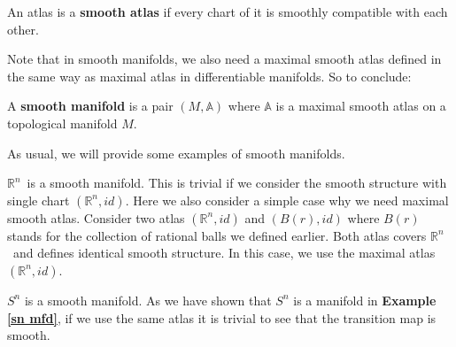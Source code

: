\documentclass[12pt,twoside]{article}
\newcommand{\rn}{$\mathbb{R}^n$}
\begin{document}
\begin{definition}
An atlas is a {\bf smooth atlas} if every chart of it is smoothly compatible with each other.
\end{definition}
Note that in smooth manifolds, we also need a maximal smooth atlas defined in the same way as maximal atlas in differentiable manifolds. So to conclude:
\begin{definition}
A {\bf smooth manifold} is a pair $(M,\mathbb{A})$ where $\mathbb{A}$ is a maximal smooth atlas on a topological manifold $M$.
\end{definition}
As usual, we will provide some examples of smooth manifolds.
\begin{example}

\rn\ is a smooth manifold. This is trivial if we consider the smooth structure with single chart $(\mathbb{R}^{n},id)$. Here we also consider a simple case why we need maximal smooth atlas. Consider two atlas $(\mathbb{R}^{n},id)$ and $(B(r),id)$ where $B(r)$ stands for the collection of rational balls we defined earlier. Both atlas covers \rn\ and defines identical smooth structure. In this case, we use the maximal atlas $(\mathbb{R}^{n},id)$.
\end{example}

\begin{example}
$S^n$ is a smooth manifold. As we have shown that $S^n$ is a manifold in \textbf{Example \ref{sn mfd}}, if we use the same atlas it is trivial to see that the transition map is smooth.
\end{example}
\end{document}

